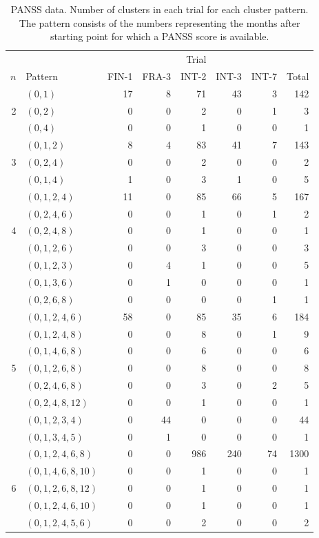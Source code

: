 \documentclass[11pt,a5paper,twoside]{book}
\begin{document}
\begin{table}[ht!]
\centering
\caption{PANSS data. Number of clusters in each trial for each cluster pattern. The pattern consists of the numbers representing the months after starting point for which a PANSS score is available.}
\label{Tab_freq}

\begin{tabular}{rlrrrrrr}
\hline\hline
 & &  &  & Trial &  &  & \\
  \cline{3-7}
$n$ &Pattern  & FIN-1 & FRA-3 & INT-2 & INT-3 & INT-7 & Total \\
  \hline
 & $(0, 1)$ & 17 & 8 & 71 & 43 & 3 & 142 \\
  2 & $(0, 2)$ & 0 & 0 & 2 & 0 & 1 & 3 \\
   & $(0, 4)$ & 0 & 0 & 1 & 0 & 0 & 1 \\ \hline
   & $(0, 1, 2)$ & 8 & 4 & 83 & 41 & 7 & 143 \\
  3 & $(0, 2, 4)$ & 0 & 0 & 2 & 0 & 0 & 2 \\
   & $(0, 1, 4)$ & 1 & 0 & 3 & 1 & 0 & 5 \\ \hline
   & $(0, 1, 2, 4)$ & 11 & 0 & 85 & 66 & 5 & 167 \\
   & $(0, 2, 4, 6)$ & 0 & 0 & 1 & 0 & 1 & 2 \\
  4 & $(0, 2, 4, 8)$ & 0 & 0 & 1 & 0 & 0 & 1 \\
   & $(0, 1, 2, 6)$ & 0 & 0 & 3 & 0 & 0 & 3 \\
   & $(0, 1, 2, 3)$ & 0 & 4 & 1 & 0 & 0 & 5 \\
   & $(0, 1, 3, 6)$ & 0 & 1 & 0 & 0 & 0 & 1 \\
  & $(0, 2, 6, 8)$ & 0 & 0 & 0 & 0 & 1 & 1 \\ \hline
   & $(0, 1, 2, 4, 6)$ & 58 & 0 & 85 & 35 & 6 & 184 \\
   & $(0, 1, 2, 4, 8)$ & 0 & 0 & 8 & 0 & 1 & 9 \\
   & $(0, 1, 4, 6, 8)$ & 0 & 0 & 6 & 0 & 0 & 6 \\
  5 & $(0, 1, 2, 6, 8)$ & 0 & 0 & 8 & 0 & 0 & 8 \\
   & $(0, 2, 4, 6, 8)$ & 0 & 0 & 3 & 0 & 2 & 5 \\
   & $(0, 2,  4,  8, 12)$ & 0 & 0 & 1 & 0 & 0 & 1 \\
   & $(0, 1, 2, 3, 4)$ & 0 & 44 & 0 & 0 & 0 & 44 \\
   & $(0, 1, 3, 4, 5)$ & 0 & 1 & 0 & 0 & 0 & 1 \\ \hline
   & $(0, 1, 2, 4, 6, 8)$ & 0 & 0 & 986 & 240 & 74 & 1300 \\
   & $(0,  1,  4,  6,  8, 10)$ & 0 & 0 & 1 & 0 & 0 & 1 \\
  6 & $(0,  1,  2,  6,  8, 12)$ & 0 & 0 & 1 & 0 & 0 & 1 \\
   & $(0,  1,  2,  4,  6, 10)$ & 0 & 0 & 1 & 0 & 0 & 1 \\
  & $(0, 1, 2, 4, 5, 6)$ & 0 & 0 & 2 & 0 & 0 & 2 \\
   \hline\hline
\end{tabular}
\end{table}
\end{document}
